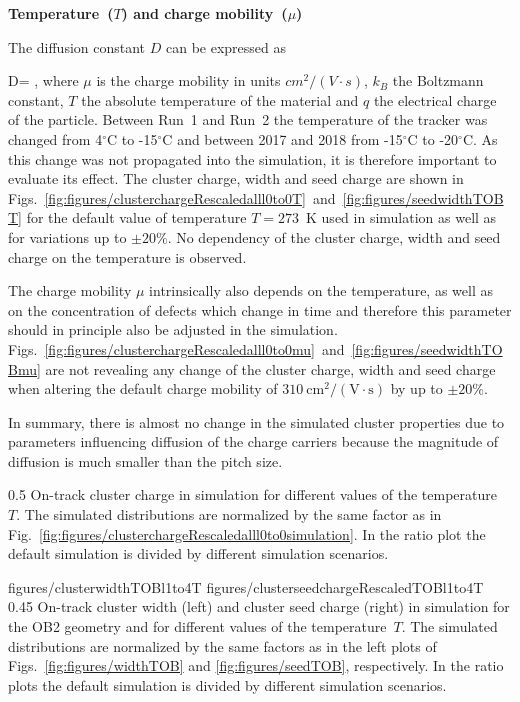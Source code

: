\textbf{Temperature~($T$) and charge mobility~($\mu$)}

The diffusion constant $D$ can be expressed as

{
   D=  ,
}
where $\mu$ is the charge mobility in units $cm^{2}/(V \cdot s)$, $k_{B}$ the Boltzmann constant, $T$ the absolute temperature of the material and $q$ the electrical charge of the particle. Between Run~1 and Run~2 the temperature of the tracker was changed from 4$^{\circ}$C to -15$^{\circ}$C and between 2017 and 2018 from -15$^{\circ}$C to -20$^{\circ}$C. As this change was not propagated into the simulation, it is therefore important to evaluate its effect. The cluster charge, width and seed charge are shown in Figs.~\ref{fig:figures/clusterchargeRescaledalll0to0T}~and~\ref{fig:figures/seedwidthTOBT} for the default value of temperature $T=273$~K used in simulation as well as for variations up to $\pm 20\%$. No dependency of the cluster charge, width and seed charge on the temperature is observed. 

The charge mobility $\mu$ intrinsically also depends on the temperature, as well as on the concentration of defects which change in time and therefore this parameter should in principle also be adjusted in the simulation. Figs.~\ref{fig:figures/clusterchargeRescaledalll0to0mu}~and~\ref{fig:figures/seedwidthTOBmu} are not revealing any change of the cluster charge, width and seed charge when altering the default charge mobility of $310~\mathrm{cm^2/(V \cdot s)}$ by up to $\pm 20\%$. 

In summary, there is almost no change in the simulated cluster properties due to parameters influencing diffusion of the charge carriers because the magnitude of diffusion is much smaller than the pitch size.


                 {0.5}       %
                 { On-track cluster charge in simulation for different values of the temperature~$T$.   The simulated distributions are normalized by the same factor as in Fig.~\ref{fig:figures/clusterchargeRescaledalll0to0simulation}.  In the ratio plot the default simulation is divided by different simulation scenarios. }

                 {figures/clusterwidthTOBl1to4T}
                 {figures/clusterseedchargeRescaledTOBl1to4T} %
                 {0.45}       %
                 {  On-track cluster width (left) and cluster seed charge (right) in simulation  for the OB2 geometry and for different values of the temperature~$T$.  The simulated distributions are normalized by the same factors as in the left plots of Figs.~\ref{fig:figures/widthTOB} and \ref{fig:figures/seedTOB}, respectively.   In the ratio plots the default simulation is divided by different simulation scenarios. }


